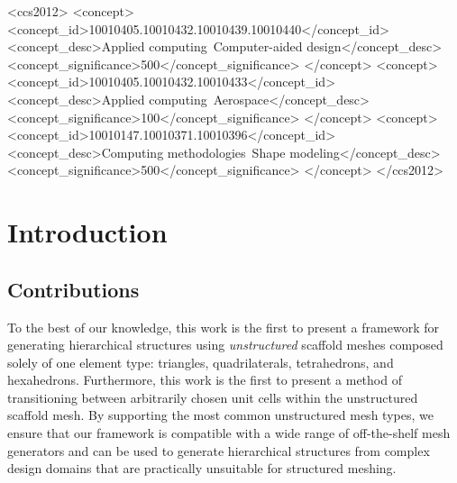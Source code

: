 \documentclass[acmtog]{acmart}
\begin{document}
\begin{CCSXML}
<ccs2012>
    <concept>
        <concept_id>10010405.10010432.10010439.10010440</concept_id>
        <concept_desc>Applied computing~Computer-aided design</concept_desc>
        <concept_significance>500</concept_significance>
        </concept>
    <concept>
        <concept_id>10010405.10010432.10010433</concept_id>
        <concept_desc>Applied computing~Aerospace</concept_desc>
        <concept_significance>100</concept_significance>
        </concept>
    <concept>
        <concept_id>10010147.10010371.10010396</concept_id>
        <concept_desc>Computing methodologies~Shape modeling</concept_desc>
        <concept_significance>500</concept_significance>
        </concept>
  </ccs2012>
\end{CCSXML}




\maketitle

\section{Introduction}

\subsection{Contributions}
To the best of our knowledge, this work is the first to present a framework for generating hierarchical structures using \textit{unstructured} scaffold meshes composed solely of one element type: triangles, quadrilaterals, tetrahedrons, and hexahedrons. Furthermore, this work is the first to present a method of transitioning between arbitrarily chosen unit cells within the unstructured scaffold mesh. By supporting the most common unstructured mesh types, we ensure that our framework is compatible with a wide range of off-the-shelf mesh generators and can be used to generate hierarchical structures from complex design domains that are practically unsuitable for structured meshing.
\end{document}
